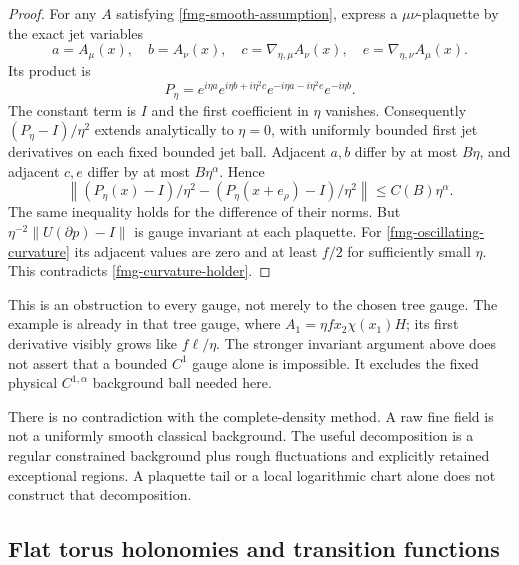 \documentclass[11pt]{article}
\theoremstyle{remark}
\begin{document}
\begin{proof}
For any \(A\) satisfying \eqref{fmg-smooth-assumption}, express
a \(\mu\nu\)-plaquette by the exact jet variables
\[
 a=A_\mu(x),\quad b=A_\nu(x),\quad
 c=\nabla_{\eta,\mu}A_\nu(x),\quad
 e=\nabla_{\eta,\nu}A_\mu(x).
\]
Its product is
\[
 P_\eta=
 e^{i\eta a}e^{i\eta b+i\eta^2c}
                  e^{-i\eta a-i\eta^2e}e^{-i\eta b}.
\]
The constant term is \(I\) and the first coefficient in \(\eta\)
vanishes. Consequently \((P_\eta-I)/\eta^2\) extends analytically
to \(\eta=0\), with uniformly bounded first jet derivatives
on each fixed bounded jet ball. Adjacent \(a,b\) differ by
at most \(B\eta\), and adjacent \(c,e\) differ by at most
\(B\eta^\alpha\). Hence
\begin{equation}
 \left\|(P_\eta(x)-I)/\eta^2
             -(P_\eta(x+e_\rho)-I)/\eta^2\right\|
                         \le C(B)\eta^\alpha .
 \label{fmg-curvature-holder}
\end{equation}
The same inequality holds for the difference of their norms.
But \(\eta^{-2}\|U(\partial p)-I\|\) is gauge invariant
at each plaquette. For \eqref{fmg-oscillating-curvature}
its adjacent values are zero and at least \(f/2\) for
sufficiently small \(\eta\). This contradicts
\eqref{fmg-curvature-holder}.
\end{proof}

This is an obstruction to every gauge, not merely to the chosen
tree gauge. The example is already in that tree gauge, where
\(A_1=\eta f x_2\chi(x_1)H\); its first derivative visibly grows
like \(f\ell/\eta\). The stronger invariant argument above
does not assert that a bounded \(C^1\) gauge alone is impossible.
It excludes the fixed physical \(C^{1,\alpha}\) background ball
needed here.

There is no contradiction with the complete-density method.
A raw fine field is not a uniformly smooth classical background.
The useful decomposition is a regular constrained background
plus rough fluctuations and explicitly retained exceptional
regions. A plaquette tail or a local logarithmic chart alone
does not construct that decomposition.

\subsection{Flat torus holonomies and transition functions}
\label{fmg-holonomy}
\end{document}
